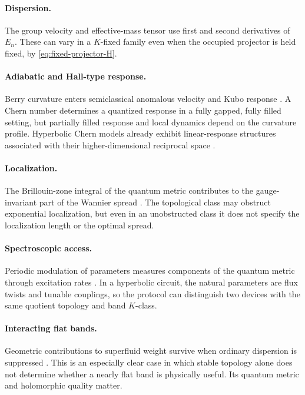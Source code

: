 \documentclass[11pt]{article}
\theoremstyle{definition}
\theoremstyle{remark}
\begin{document}
\paragraph{Dispersion.}
The group velocity and effective-mass tensor use first and second derivatives
of \(E_n\).  These can vary in a \(K\)-fixed family even when the occupied
projector is held fixed, by \eqref{eq:fixed-projector-H}.

\paragraph{Adiabatic and Hall-type response.}
Berry curvature enters semiclassical anomalous velocity and Kubo response
\cite{XiaoChangNiu}.  A Chern number determines a quantized response in a
fully gapped, fully filled setting, but partially filled response and local
dynamics depend on the curvature profile.  Hyperbolic Chern models already
exhibit linear-response structures associated with their
higher-dimensional reciprocal space \cite{SunEtAl2024}.

\paragraph{Localization.}
The Brillouin-zone integral of the quantum metric contributes to the
gauge-invariant part of the Wannier spread
\cite{MarzariVanderbilt,MarzariReview}.  The topological class may obstruct
exponential localization, but even in an unobstructed class it does not
specify the localization length or the optimal spread.

\paragraph{Spectroscopic access.}
Periodic modulation of parameters measures components of the quantum metric
through excitation rates \cite{OzawaGoldman}.  In a hyperbolic circuit, the
natural parameters are flux twists and tunable couplings, so the protocol
can distinguish two devices with the same quotient topology and band
\(K\)-class.

\paragraph{Interacting flat bands.}
Geometric contributions to superfluid weight survive when ordinary
dispersion is suppressed \cite{PeottaTorma}.  This is an especially clear
case in which stable topology alone does not determine whether a nearly flat
band is physically useful.  Its quantum metric and holomorphic quality
matter.
\end{document}
